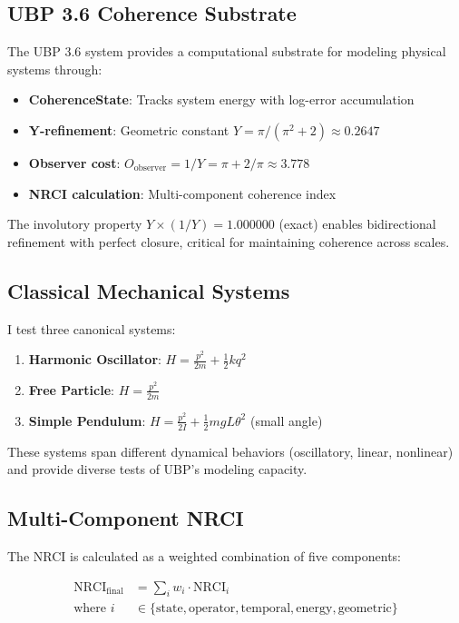 \documentclass[11pt,a4paper]{article}
\begin{document}
\subsection{UBP 3.6 Coherence Substrate}

The UBP 3.6 system\cite{craig2025ubp36} provides a computational substrate for modeling physical systems through:

\begin{itemize}
    \item \textbf{CoherenceState}: Tracks system energy with log-error accumulation
    \item \textbf{Y-refinement}: Geometric constant $Y = \pi/(\pi^2 + 2) \approx 0.2647$
    \item \textbf{Observer cost}: $O_{\text{observer}} = 1/Y = \pi + 2/\pi \approx 3.778$
    \item \textbf{NRCI calculation}: Multi-component coherence index
\end{itemize}

The involutory property $Y \times (1/Y) = 1.000000$ (exact) enables bidirectional refinement with perfect closure, critical for maintaining coherence across scales.

\subsection{Classical Mechanical Systems}

I test three canonical systems:

\begin{enumerate}
    \item \textbf{Harmonic Oscillator}: $H = \frac{p^2}{2m} + \frac{1}{2}kq^2$
    \item \textbf{Free Particle}: $H = \frac{p^2}{2m}$
    \item \textbf{Simple Pendulum}: $H = \frac{p^2}{2I} + \frac{1}{2}mgL\theta^2$ (small angle)
\end{enumerate}

These systems span different dynamical behaviors (oscillatory, linear, nonlinear) and provide diverse tests of UBP's modeling capacity.

\subsection{Multi-Component NRCI}

The NRCI is calculated as a weighted combination of five components:

\begin{align}
\text{NRCI}_{\text{final}} &= \sum_{i} w_i \cdot \text{NRCI}_i \\
\text{where } i &\in \{\text{state}, \text{operator}, \text{temporal}, \text{energy}, \text{geometric}\}
\end{align}
\end{document}
